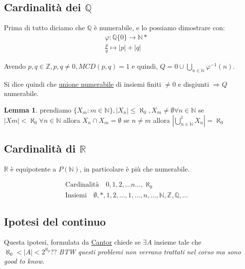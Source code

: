 \documentclass{article}
\theoremstyle{definition}
\newtheorem{lemma}{Lemma}[section]
\begin{document}
\subsection{Cardinalità dei $\mathbb{Q}$}
Prima di tutto diciamo che $\mathbb{Q}$ è numerabile, e lo possiamo dimostrare con:
\begin{align*}
        \varphi : \mathbb{Q}\{0\} \to \mathbb{N}* \\
        \frac{p}{q} \mapsto |p| + |q|
\end{align*}

Avendo $p,q \in \mathbb{Z}, p,q \not = 0, MCD(p,q)=1$ e quindi, $Q = {0} \cup \bigcup_{n \in \mathbb{N}}{\varphi^{-1}(n)}$.

Si dice quindi che \underline{unione numerabile} di insiemi finiti $\not = 0$ e disgiunti $\Rightarrow Q $ numerabile. \newline
{}

\begin{lemma}
        prendiamo $\{X_m : m \in \mathbb{N}\}, |X_n| \le \aleph_0, X_m \not = \emptyset \forall n \in \mathbb{N}$ se $|Xm| < \aleph_0 \forall n \in \mathbb{N}$ allora $X_n \cap X_m = \emptyset$ se $n \not = m$ allora $|\bigcup_{n \in \mathbb{N}}^{1}X_n| = \aleph_0$ \newline
\end{lemma}

\subsection{Cardinalità di $\mathbb{R}$}
$ \mathbb{R}$ è equipotente a $P(\mathbb{N})$, in particolare è più che numerabile. \par

\begin{align*}
        \mbox{Cardinalità} \quad 0,1,2,\ldots n\ldots,\aleph_0 \\
        \mbox{Insiemi} \quad \emptyset, {*}, {1,2}, \ldots, {1,\ldots,n},\ldots,\mathbb{N},\mathbb{Z},\mathbb{Q},\ldots        
\end{align*}



\subsection{Ipotesi del continuo}
Questa ipotesi, formulata da \underline{Cantor} chiede se $ \exists A$ insieme tale che $\aleph_0 < |A| < 2^{\aleph_0}$?? 
\textit{BTW questi problemi non verrano trattati nel corso ma sono good to know}.
\end{document}
